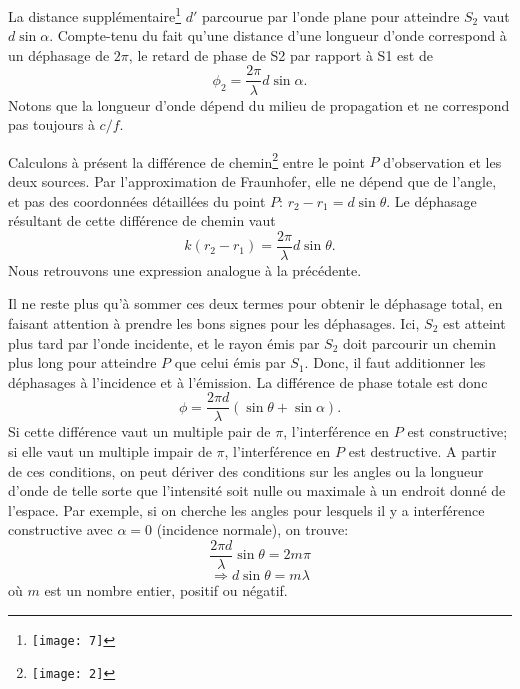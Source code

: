 La distance supplémentaire\footnote{\texttt{[image: 7]}} $d'$ parcourue par l'onde plane pour atteindre $S_2$ vaut $d\sin\alpha$. Compte-tenu du fait qu'une distance d'une longueur d'onde correspond à un déphasage de $2\pi$, le retard de phase de S2 par rapport à S1 est de 
$$ \phi_2=\frac{2\pi}{\lambda}d\sin\alpha.$$ 
Notons que la longueur d'onde dépend du milieu de propagation et ne correspond pas toujours à $c/f$.

Calculons à présent la différence de chemin\footnote{
\texttt{[image: 2]}} entre le point $P$ d'observation et les deux sources. Par l'approximation de Fraunhofer, elle ne dépend que de l'angle, et pas des coordonnées détaillées du point $P$: $r_2-r_1=d\sin\theta$.
Le déphasage résultant de cette différence de chemin vaut 
$$k(r_2-r_1)=\frac{2\pi}{\lambda}d\sin\theta.$$ 
Nous retrouvons une expression analogue à la précédente.

Il ne reste plus qu'à sommer ces deux termes pour obtenir le déphasage total, en faisant attention à prendre les bons signes pour les déphasages. Ici, $S_2$ est atteint plus tard par l'onde incidente, et le rayon émis par $S_2$ doit parcourir un chemin plus long pour atteindre $P$ que celui émis par $S_1$. Donc, il faut additionner les déphasages à l'incidence et à l'émission. La différence de phase totale est donc 
$$\phi=\frac{2\pi d}{\lambda}(\sin \theta +\sin \alpha).$$
Si cette différence vaut un multiple pair de $\pi$, l'interférence en $P$ est constructive; si elle vaut un multiple impair de $\pi$, l'interférence en $P$ est destructive. A partir de ces conditions, on peut dériver des conditions sur les angles ou la longueur d'onde de telle sorte que l'intensité soit nulle ou maximale à un endroit donné de l'espace. Par exemple, si on cherche les angles pour lesquels il y a interférence constructive avec $\alpha=0$ (incidence normale), on trouve: 
$$ \frac{2\pi d}{\lambda}\sin \theta=2m\pi$$
$$ \Rightarrow d \sin \theta =m\lambda$$
 où $m$ est un nombre entier, positif ou négatif. 
 
